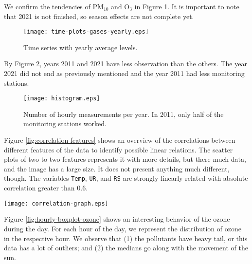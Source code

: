 We confirm the tendencies of PM$_{10}$ and O$_3$ in Figure \ref{fig:time-series-gases-year}. It is important to note that
2021 is not finished, so season effects are not complete yet.

\begin{figure}[!ht]
    \centering
    \texttt{[image: time-plots-gases-yearly.eps]}
    \caption{Time series with yearly average levels.}
    \label{fig:time-series-gases-year}
\end{figure}

By Figure \ref{fig:histogram-obs-years}, years 2011 and 2021 have less
observation than the others. The year 2021 did not end as previously
mentioned and the year 2011 had less monitoring stations.  

\begin{figure}
    \begin{center}
        \texttt{[image: histogram.eps]}
    \end{center}
    \caption{Number of hourly measurements per year. In 2011, only half of the monitoring stations worked.}
    \label{fig:histogram-obs-years}
\end{figure}

Figure \ref{fig:correlation-features} shows an overview of the correlations
between different features of the data to identify possible linear relations.
The scatter plots of two to two features represents it with more details, but
there much data, and the image has a large size. It does not present anything
much different, though. The variables {\tt Temp}, {\tt UR}, and {\tt RS} are
strongly linearly related with absolute correlation greater than 0.6.

\begin{figure*}[t]
    \begin{center}
        \texttt{[image: correlation-graph.eps]}
    \end{center}
    \caption{Correlation heat map comparing the data features.}
    \label{fig:correlation-features}
\end{figure*}

Figure \ref{fig:hourly-boxplot-ozone} shows an interesting behavior of the ozone during the day. For each hour of the day, we represent the distribution of ozone in the respective hour. We
observe that (1) the pollutants have heavy tail, or this data has a lot of
outliers; and (2) the medians go along with the movement of the sun.

\vspace{-0.5cm}

